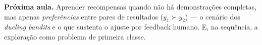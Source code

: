 \documentclass[11pt]{article}
\begin{document}
\vspace{0.6em}
\begin{ideiabox}
  \textbf{Próxima aula.} Aprender recompensas quando não há demonstrações completas, mas
  apenas \emph{preferências} entre pares de resultados ($y_1 \succ y_2$) --- o cenário dos
  \emph{dueling bandits} e o que sustenta o ajuste por feedback humano. E, na sequência, a
  exploração como problema de primeira classe.
\end{ideiabox}
\end{document}
